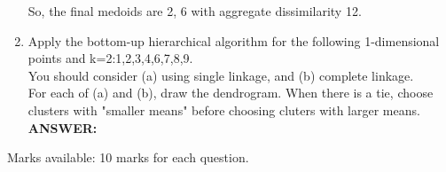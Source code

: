 \documentclass{article}
\begin{document}
\begin{enumerate}
So, the final medoids are 2, 6 with aggregate dissimilarity 12. 

\item Apply the bottom-up hierarchical algorithm for the following
  1-dimensional points and k=2:1,2,3,4,6,7,8,9.\\
  You should consider (a) using single linkage, and (b) complete
  linkage.\\ 
  For each of (a) and (b), draw the dendrogram. When there is a tie,
  choose clusters with "smaller means" before choosing cluters with
  larger means. \\
\textbf{ANSWER:} \\

\end{enumerate} %

Marks available: 10 marks for each question. 
\end{document}
